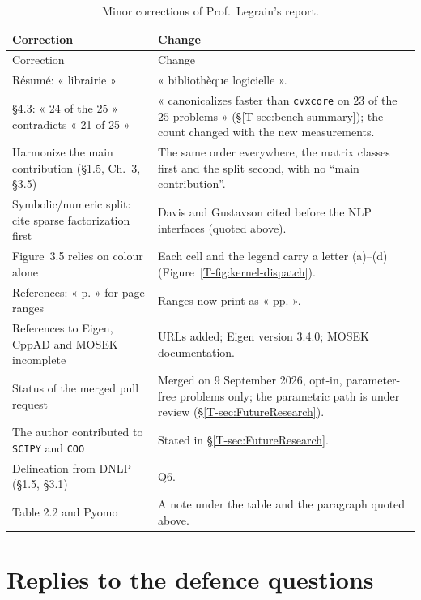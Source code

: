 \documentclass[letterpaper,12pt]{article}
\newcommand{\ac}[1]{#1}
\newcommand{\tsec}[1]{\S\ref{T-#1}}
\begin{document}
{\small
\begin{longtable}{>{\raggedright}p{} >{\raggedright\arraybackslash}p{}}
\caption{Minor corrections of Prof.~Legrain's report.}\label{tab:minor}\\
\toprule
Correction & Change \\
\midrule
\endfirsthead
\toprule
Correction & Change \\
\midrule
\endhead
\bottomrule
\endfoot
Résumé: « librairie » & « bibliothèque logicielle ». \\
§4.3: « 24 of the 25 » contradicts « 21 of 25 »
  & « canonicalizes faster than \texttt{cvxcore} on $23$ of the $25$ problems »
    (\tsec{sec:bench-summary}); the count changed with the new measurements. \\
Harmonize the main contribution (§1.5, Ch.~3, §3.5)
  & The same order everywhere, the matrix classes first and the split second, with no ``main
    contribution''. \\
Symbolic/numeric split: cite sparse factorization first
  & Davis and Gustavson cited before the \ac{NLP} interfaces (quoted above). \\
Figure~3.5 relies on colour alone
  & Each cell and the legend carry a letter (a)--(d) (Figure~\ref{T-fig:kernel-dispatch}). \\
References: « p. » for page ranges
  & Ranges now print as « pp. ». \\
References to Eigen, CppAD and MOSEK incomplete
  & URLs added; Eigen version 3.4.0; MOSEK documentation. \\
Status of the merged pull request
  & Merged on 9 September 2026, opt-in, parameter-free problems only; the parametric path is
    under review (\tsec{sec:FutureResearch}). \\
The author contributed to \texttt{SCIPY} and \texttt{COO}
  & Stated in \tsec{sec:FutureResearch}. \\
Delineation from DNLP (§1.5, §3.1)
  & Q6. \\
Table 2.2 and Pyomo
  & A note under the table and the paragraph quoted above. \\
\end{longtable}}

\section{Replies to the defence questions}\label{sec:replies}
\end{document}
